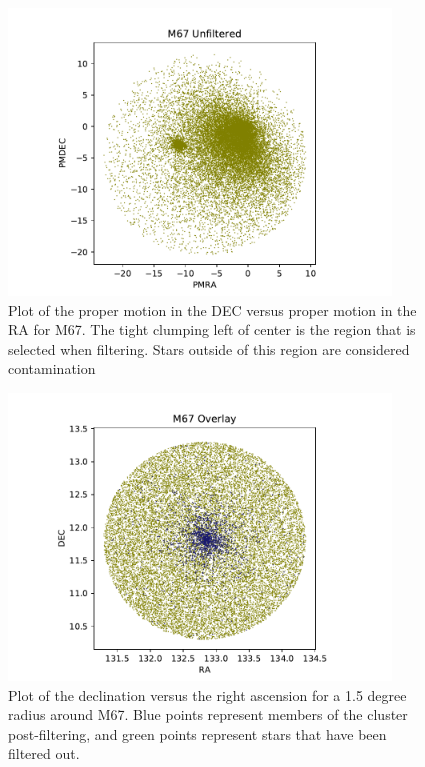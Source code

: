 \documentclass[aps,prb,twocolumn,groupedaddress,nofootinbib,floatfix]{revtex4-1}
\begin{document}
\begin{figure}[!h]
	\centering
      \includegraphics[width=4in]{M67_pm_unfiltered.pdf}
	\caption{Plot of the proper motion in the DEC versus proper motion in the RA for M67. The tight clumping left of center is the region that is selected when filtering. Stars outside of this region are considered contamination}
	\label{fig:M67_pos}
\end{figure}


\begin{figure}[!h]
	\centering
      \includegraphics[width=4in]{M67_ra_dec_overlay.pdf}
	\caption{Plot of the declination versus the right ascension for a 1.5 degree radius around M67. Blue points represent members of the cluster post-filtering, and green points represent stars that have been filtered out.}
	\label{fig:M67_pos}
\end{figure}
\end{document}
